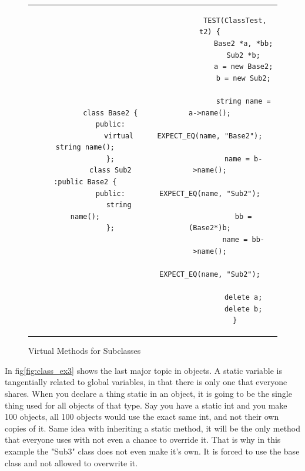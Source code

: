 \documentclass[12pt]{article}
\begin{document}
\begin{figure}[!ht]
	\centering
	\begin{tabular}{c c}
		\begin{minipage}[t]{0.45\textwidth}
		\begin{verbatim}
			class Base2 {
			public:
				virtual string name();
			};
			class Sub2 :public Base2 {
			public:
				string name();
			};
		\end{verbatim}
		\end{minipage}
		&
		\begin{minipage}[t]{0.5\textwidth}
		\begin{verbatim}
			TEST(ClassTest, t2) {
				Base2 *a, *bb;
				Sub2 *b;
				a = new Base2;
				b = new Sub2;

				string name = a->name();
				EXPECT_EQ(name, "Base2");

				name = b->name();
				EXPECT_EQ(name, "Sub2");

				bb = (Base2*)b;
				name = bb->name();
				EXPECT_EQ(name, "Sub2");

				delete a;
				delete b;
			}
		\end{verbatim}
		\end{minipage}
		\\
	\end{tabular}
	\caption{Virtual Methods for Subclasses}
	\label{fig:class_ex2}
\end{figure}

\newpage
In fig\ref{fig:class_ex3} shows the last major topic in objects.
A static variable is tangentially related to global variables, in that there is only one that everyone shares.
When you declare a thing static in an object, it is going to be the single thing used for all objects of that type.
Say you have a static int and you make 100 objects, all 100 objects would use the exact same int, and not their own copies of it.
Same idea with inheriting a static method, it will be the only method that everyone uses with not even a chance to override it.
That is why in this example the "Sub3" class does not even make it's own.
It is forced to use the base class and not allowed to overwrite it.
\end{document}
